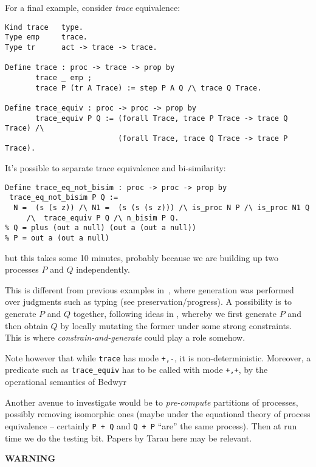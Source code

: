 \documentclass[a4paper]{easychair}
\begin{document}
For a final example, consider \emph{trace} equivalence:
\begin{lstlisting}
Kind trace   type.
Type emp     trace.
Type tr      act -> trace -> trace.

Define trace : proc -> trace -> prop by
       trace _ emp ;
       trace P (tr A Trace) := step P A Q /\ trace Q Trace.

Define trace_equiv : proc -> proc -> prop by
       trace_equiv P Q := (forall Trace, trace P Trace -> trace Q Trace) /\
                          (forall Trace, trace Q Trace -> trace P Trace).
\end{lstlisting}
It's possible to separate trace equivalence and bi-similarity:
\begin{changebar}
\begin{lstlisting}
Define trace_eq_not_bisim : proc -> proc -> prop by
 trace_eq_not_bisim P Q :=
  N =  (s (s z)) /\ N1 =  (s (s (s z))) /\ is_proc N P /\ is_proc N1 Q
	 /\  trace_equiv P Q /\ n_bisim P Q.
% Q = plus (out a null) (out a (out a null))
% P = out a (out a null)
\end{lstlisting}
but this takes some 10 minutes, probably because we are building up two processes $P$ and $Q$
independently.
\end{changebar}
This is different from previous examples
in~\cite{Blanco0M19}, where generation was performed over judgments
such as typing (see preservation/progress). A possibility is to
generate $P$ and $Q$ together, following ideas in \cite{TNIQ}, whereby
we first generate $P$ and then obtain $Q$ by locally mutating the
former under some strong constraints. This is where
\emph{constrain-and-generate} could play a role somehow.
\begin{changebar}
  Note however that while \texttt{trace} has mode \texttt{+,-}, it is
  non-deterministic. Moreover, a predicate such as \texttt{trace\_equiv}
  has to be called with mode \texttt{+,+}, by the operational
  semantics of Bedwyr
\end{changebar}
Another avenue to investigate would be to \emph{pre-compute}
partitions of processes, possibly removing isomorphic ones (maybe
under the equational theory of process equivalence -- certainly
\texttt{P + Q} and \texttt{Q + P} ``are'' the same process). Then at
run time we do the testing bit. Papers by Tarau here may be relevant.

\begin{center}
  \begin{huge}
  \textbf{WARNING}
  \end{huge}
\end{center}
\end{document}
